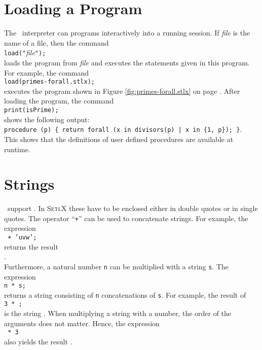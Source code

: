 \section{Loading a Program}
The \setlx\ interpreter can  programs interactively into a running session.
If \textsl{file} is the name of a file, then the command
\\[0.2cm]
\hspace*{1.3cm}
\texttt{load("}\textsl{file}\texttt{");}
\\[0.2cm]
loads the program from  \textsl{file} and executes the statements given in this program.
For example, the command
\\[0.2cm]
\hspace*{1.3cm}
\texttt{load(primes-forall.stlx);}
\\[0.2cm]
executes the program shown in Figure
\ref{fig:primes-forall.stlx} on page \pageref{fig:primes-forall.stlx}.
After loading the program, the command
\\[0.2cm]
\hspace*{1.3cm}
\texttt{print(isPrime);}
\\[0.2cm]
shows the following output:
\\[0.2cm]
\hspace*{1.3cm}
\texttt{procedure (p) \{ return forall (x in divisors(p) | x in \{1, p\}); \}}.
\\[0.2cm]
This shows that the definitions of user defined procedures are available at runtime.

\section{Strings}
\setlx\ support .  In  \textsc{SetlX} these have to be enclosed either in double quotes or in
single quotes.  The operator ``\texttt{+}'' can be used to concatenate strings.  For example, the expression
\\[0.2cm]
\hspace*{1.3cm}
\texttt{ + \texttt{'uvw'};}
\\[0.2cm]
returns the result
\\[0.2cm]
\hspace*{1.3cm}
.
\\[0.2cm]
Furthermore, a natural number \texttt{n} can be multiplied with a string \texttt{s}.  The expression
\\[0.2cm]
\hspace*{1.3cm}
\texttt{n * s;}
\\[0.2cm]
returns a string consisting of \texttt{n} concatenations of \texttt{s}.  For example,
the result of
\\[0.2cm]
\hspace*{1.3cm}
\texttt{3 * ;}
\\[0.2cm]
is the string .  When multiplying a string with a number, the order of the
arguments does not matter. Hence, the expression
\\[0.2cm]
\hspace*{1.3cm}
\texttt{ * 3}
\\[0.2cm]
also yields the result .

